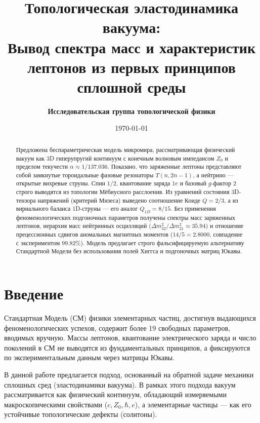 \documentclass[12pt,a4paper]{article}
\title{\textbf{Топологическая эластодинамика вакуума:\\ Вывод спектра масс и характеристик лептонов из первых принципов сплошной среды}}
\author{\textbf{Исследовательская группа топологической физики}}
\date{\today}
\begin{document}
	
	\maketitle
	
	\begin{abstract}
		Предложена беспараметрическая модель микромира, рассматривающая физический вакуум как 3D гиперупругий континуум с конечным волновым импедансом $Z_0$ и пределом текучести $\alpha \approx 1/137.036$. Показано, что заряженные лептоны представляют собой замкнутые тороидальные фазовые резонаторы $T(n, 2n-1)$, а нейтрино — открытые вихревые струны. Спин $1/2$, квантование заряда $1e$ и базовый $g$-фактор $2$ строго выводятся из топологии Мёбиусного расслоения. Из уравнений состояния 3D-тензора напряжений (критерий Мизеса) выведено соотношение Коиде $Q = 2/3$, а из вириального баланса 1D-струны — его аналог $Q_{1D} = 8/15$. Без применения феноменологических подгоночных параметров получены спектры масс заряженных лептонов, иерархия масс нейтринных осцилляций ($\Delta m_{32}^2 / \Delta m_{21}^2 \approx 35.94$) и отношение прецессионных сдвигов аномальных магнитных моментов ($14/5 = 2.8000$, совпадение с экспериментом 99.82\%). Модель предлагает строго фальсифицируемую альтернативу Стандартной Модели без использования полей Хиггса и подгоночных матриц Юкавы.
	\end{abstract}
	
	\newpage
	\tableofcontents
	\newpage
	
	\section{Введение}
	Стандартная Модель (СМ) физики элементарных частиц, достигнув выдающихся феноменологических успехов, содержит более 19 свободных параметров, вводимых вручную. Массы лептонов, квантование электрического заряда и число поколений в СМ не выводятся из фундаментальных принципов, а фиксируются по экспериментальным данным через матрицы Юкавы.
	
	В данной работе предлагается подход, основанный на обратной задаче механики сплошных сред (эластодинамики вакуума). В рамках этого подхода вакуум рассматривается как физический континуум, обладающий измеряемыми макроскопическими свойствами ($c, Z_0, \hbar, e$), а элементарные частицы — как его устойчивые топологические дефекты (солитоны).
	
\end{document}
